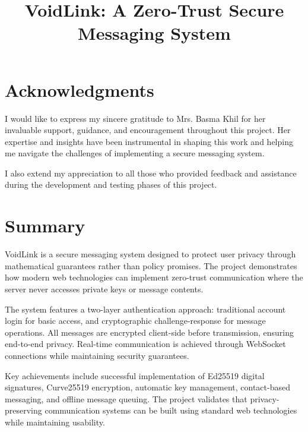 \documentclass[12pt,a4paper,openany]{book}
\title{VoidLink: A Zero-Trust Secure Messaging System}
\author{}
\date{}
\begin{document}
\frontmatter
{}
\setcounter{page}{1}

\newpage
\pagestyle{frontmatter}  %

\chapter*{Acknowledgments}
\thispagestyle{frontmatter}  %

I would like to express my sincere gratitude to Mrs. Basma Khil for her invaluable support, guidance, and encouragement throughout this project. Her expertise and insights have been instrumental in shaping this work and helping me navigate the challenges of implementing a secure messaging system.

I also extend my appreciation to all those who provided feedback and assistance during the development and testing phases of this project.

\newpage
\pagestyle{frontmatter}  %

\chapter*{Summary}
\thispagestyle{frontmatter}  %

VoidLink is a secure messaging system designed to protect user privacy through mathematical guarantees rather than policy promises. The project demonstrates how modern web technologies can implement zero-trust communication where the server never accesses private keys or message contents.

The system features a two-layer authentication approach: traditional account login for basic access, and cryptographic challenge-response for message operations. All messages are encrypted client-side before transmission, ensuring end-to-end privacy. Real-time communication is achieved through WebSocket connections while maintaining security guarantees.

Key achievements include successful implementation of Ed25519 digital signatures, Curve25519 encryption, automatic key management, contact-based messaging, and offline message queuing. The project validates that privacy-preserving communication systems can be built using standard web technologies while maintaining usability.
\end{document}
